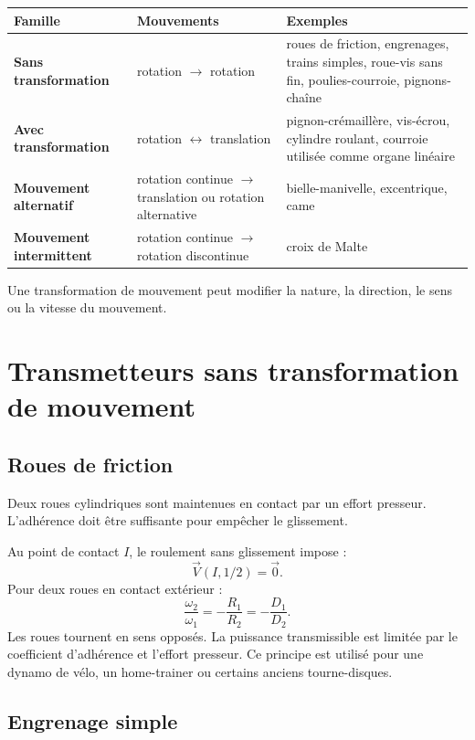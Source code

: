 \begin{center}
\small
\begin{tabularx}{\linewidth}{>{\bfseries}p{3cm}p{3cm}X}
\toprule
Famille & Mouvements & Exemples \\
\midrule
Sans transformation & rotation $\rightarrow$ rotation & roues de friction, engrenages, trains simples, roue-vis sans fin, poulies-courroie, pignons-chaîne \\
Avec transformation & rotation $\leftrightarrow$ translation & pignon-crémaillère, vis-écrou, cylindre roulant, courroie utilisée comme organe linéaire \\
Mouvement alternatif & rotation continue $\rightarrow$ translation ou rotation alternative & bielle-manivelle, excentrique, came \\
Mouvement intermittent & rotation continue $\rightarrow$ rotation discontinue & croix de Malte \\
\bottomrule
\end{tabularx}
\end{center}

Une transformation de mouvement peut modifier la nature, la direction,
le sens ou la vitesse du mouvement.

\section{Transmetteurs sans transformation de mouvement}
\label{sec:trans-sans}

\subsection{Roues de friction}

Deux roues cylindriques sont maintenues en contact par un effort presseur.
L'adhérence doit être suffisante pour empêcher le glissement.

\begin{center}\TLRouesFriction\end{center}

Au point de contact $I$, le roulement sans glissement impose :
\[
\vec V(I,1/2)=\vec0.
\]
Pour deux roues en contact extérieur :
\[
\boxed{\frac{\omega_2}{\omega_1}=-\frac{R_1}{R_2}
=-\frac{D_1}{D_2}.}
\]
Les roues tournent en sens opposés. La puissance transmissible est
limitée par le coefficient d'adhérence et l'effort presseur. Ce principe
est utilisé pour une dynamo de vélo, un home-trainer ou certains anciens
tourne-disques.

\subsection{Engrenage simple}

